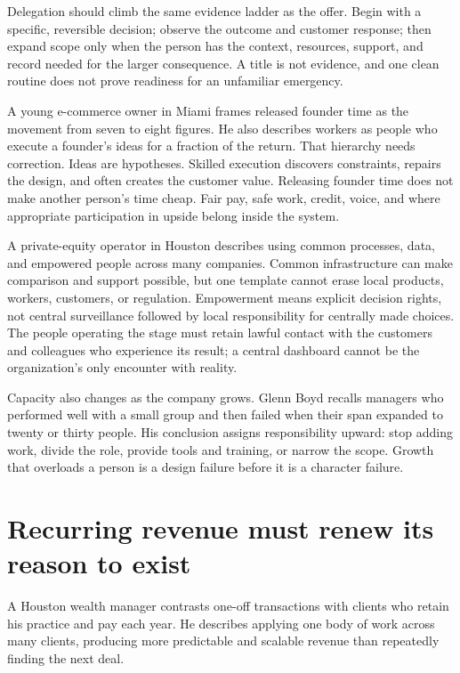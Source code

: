 Delegation should climb the same evidence ladder as the offer. Begin with a
specific, reversible decision; observe the outcome and customer response; then
expand scope only when the person has the context, resources, support, and
record needed for the larger consequence. A title is not evidence, and one
clean routine does not prove readiness for an unfamiliar emergency.

A young e-commerce owner in Miami frames released founder time as the movement
from seven to eight figures. He also describes workers as people who execute a
founder's ideas for a fraction of the return. That hierarchy needs correction.
Ideas are hypotheses. Skilled execution discovers constraints, repairs the
design, and often creates the customer value. Releasing founder time does not
make another person's time cheap. Fair pay, safe work, credit, voice, and where
appropriate participation in upside belong inside the system.

A private-equity operator in Houston describes using common processes, data,
and empowered people across many companies. Common infrastructure can make
comparison and support possible, but one template cannot erase local products,
workers, customers, or regulation. Empowerment means explicit decision rights,
not central surveillance followed by local responsibility for centrally made
choices. The people operating the stage must retain lawful contact with the
customers and colleagues who experience its result; a central dashboard cannot
be the organization's only encounter with reality.

Capacity also changes as the company grows. Glenn Boyd recalls managers who
performed well with a small group and then failed when their span expanded to
twenty or thirty people. His conclusion assigns responsibility upward: stop
adding work, divide the role, provide tools and training, or narrow the scope.
Growth that overloads a person is a design failure before it is a character
failure.

\section{Recurring revenue must renew its reason to exist}

A Houston wealth manager contrasts one-off transactions with clients who retain
his practice and pay each year. He describes applying one body of work across
many clients, producing more predictable and scalable revenue than repeatedly
finding the next deal.


